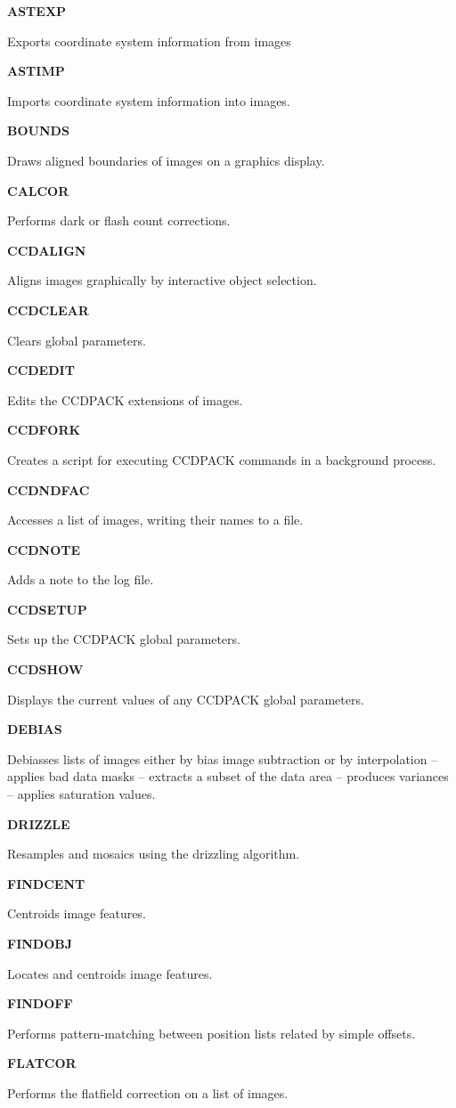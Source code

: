\documentclass[twoside,11pt]{article}
\newenvironment{latexonly}{}{}
\renewcommand{\_}{\texttt{\symbol{95}}}
\newcommand{\quickdes}[3]{
                         \parbox{1.1in}{\bf #1}
                         \parbox{4.4in}{\raggedright #2 \dotfill}
                         \parbox{0.6in}{\pageref{#3}}
                         \vspace*{0.2in}}
\begin{document}
\begin{latexonly}
\quickdes{ASTEXP}{Exports coordinate system information from images}
         {ASTEXP}

\quickdes{ASTIMP}{Imports coordinate system information into images.}{ASTIMP}

\quickdes{BOUNDS}{Draws aligned boundaries of images on a graphics display.}
                 {BOUNDS}

\quickdes{CALCOR}{Performs dark or flash count corrections.}{CALCOR}

\quickdes{CCDALIGN}{Aligns images graphically by interactive object selection.}
         {CCDALIGN}

\quickdes{CCDCLEAR}{Clears global parameters.}
         {CCDCLEAR}

\quickdes{CCDEDIT}{Edits the CCDPACK extensions of images.}
         {CCDEDIT}

\quickdes{CCDFORK}{Creates a script for executing CCDPACK
                   commands in a background process.}{CCDFORK}

\quickdes{CCDNDFAC}{Accesses a list of images, writing their names to a file.}
         {CCDNDFAC}

\quickdes{CCDNOTE}{Adds a note to the log file.}{CCDNOTE}

\quickdes{CCDSETUP}{Sets up the CCDPACK global parameters.}{CCDSETUP}

\quickdes{CCDSHOW}{Displays the current values of any CCDPACK global
                   parameters.}{CCDSHOW}

\quickdes{DEBIAS}{Debiasses lists of images either by bias image
                 subtraction or by interpolation --
                 applies bad data masks --
                 extracts a subset of the data area --
                 produces variances --
                 applies saturation values.}
                 {DEBIAS}

\quickdes{DRIZZLE}{Resamples and mosaics using the drizzling algorithm.}
                  {DRIZZLE}

\quickdes{FINDCENT}{Centroids image features.}
                   {FINDCENT}

\quickdes{FINDOBJ}{Locates and centroids image features.}
                  {FINDOBJ}

\quickdes{FINDOFF}{Performs pattern-matching between position lists
                   related by simple offsets.}
                   {FINDOFF}

\quickdes{FLATCOR}{Performs the flatfield correction on a list of images.}
                  {FLATCOR}

\end{latexonly}
\end{document}
